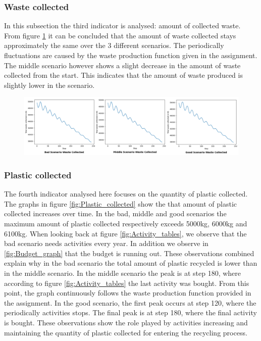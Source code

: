 \subsubsection{Waste collected}
\noindent In this subsection the third indicator is analysed: amount of collected waste. \\

\noindent From figure \ref{fig:Waste_collected_Graph} it can be concluded that the amount of waste collected stays approximately the same over the 3 different scenarios. The periodically fluctuations are caused by the waste production function given in the assignment. The middle scenario however shows a slight decrease in the amount of waste collected from the start. This indicates that the amount of waste produced is slightly lower in the scenario. 

\begin{figure}[H]
    \centering
        \captionsetup{width=\linewidth}
        \includegraphics[width=1.0\linewidth]{Images/Collected_waste_graphs.png}
        \caption{}
    \label{fig:Waste_collected_Graph}
\end{figure}

\subsubsection{Plastic collected}
\noindent The fourth indicator analysed here focuses on the quantity of plastic collected. \\

\noindent The graphs in figure \ref{fig:Plastic_collected} show the that amount of plastic collected increases over time. In the bad, middle and good scenarios the maximum amount of plastic collected respectively exceeds  5000kg, 6000kg and 6100kg. When looking back at figure \ref{fig:Activity_tables}, we observe that the bad scenario needs activities every year. In addition we observe in \ref{fig:Budget_graph} that the budget is running out. These observations combined explain why in the bad scenario the total amount of plastic recycled is lower than in the middle scenario. In the middle scenario the peak is at step 180, where according to figure \ref{fig:Activity_tables} the last activity was bought. From this point, the graph continuously follows the waste production function provided in the assignment. In the good scenario, the first peak occurs at step 120, where the periodically activities stops. The final peak is at step 180, where the final activity is bought. These observations show the role played by activities increasing and maintaining the quantity of plastic collected for entering the recycling process. 

